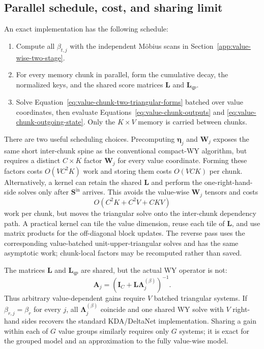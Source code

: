 \documentclass[11pt]{article}
\newcommand{\ve}[1]{\boldsymbol{#1}}
\begin{document}
\subsection{Parallel schedule, cost, and sharing limit}
\label{app:value-wise-chunk-cost}

An exact implementation has the following schedule:
\begin{enumerate}
  \item Compute all $\beta_{t,j}$ with the independent M\"obius scans in
    Section~\ref{app:value-wise-two-stage}.
  \item For every memory chunk in parallel, form the cumulative decay, the normalized keys, and
    the shared score matrices $\ve{L}$ and $\ve{L}_{qp}$.
  \item Solve Equation~\eqref{eq:value-chunk-two-triangular-forms} batched over value coordinates,
    then evaluate Equations~\eqref{eq:value-chunk-outputs} and
    \eqref{eq:value-chunk-outgoing-state}.  Only the $K\times V$ memory is carried between chunks.
\end{enumerate}

There are two useful scheduling choices.  Precomputing $\ve{\eta}_j$ and $\ve{W}_j$ exposes the same
short inter-chunk spine as the conventional compact-WY algorithm, but requires a distinct
$C\times K$ factor $\ve{W}_j$ for every value coordinate.  Forming these factors costs
$O(VC^2K)$ work and storing them costs $O(VCK)$ per chunk.  Alternatively, a kernel can retain
the shared $\ve{L}$ and perform the one-right-hand-side solves only after
$\ve{S}^{\mathrm{in}}$ arrives.  This avoids the value-wise $\ve{W}_j$ tensors and costs
\begin{equation}
  O(C^2K+C^2V+CKV)
  \label{eq:value-chunk-direct-cost}
\end{equation}
work per chunk, but moves the triangular solve onto the inter-chunk dependency path.  A practical
kernel can tile the value dimension, reuse each tile of $\ve{L}$, and use matrix products for the
off-diagonal block updates.
The reverse pass uses the corresponding value-batched unit-upper-triangular solves and has the
same asymptotic work; chunk-local factors may be recomputed rather than saved.

The matrices $\ve{L}$ and $\ve{L}_{qp}$ are shared, but the actual WY operator is not:
\begin{equation}
  \ve{A}_j=(\ve{I}_C+\ve{L}\ve{\Lambda}^{(\beta)}_j)^{-1}.
  \label{eq:value-chunk-sharing-limit}
\end{equation}
Thus arbitrary value-dependent gains require $V$ batched triangular systems.  If
$\beta_{r,j}=\beta_r$ for every $j$, all $\ve{\Lambda}^{(\beta)}_j$ coincide and one shared WY
solve with $V$ right-hand sides recovers the standard KDA/DeltaNet implementation.  Sharing a gain
within each
of $G$ value groups similarly requires only $G$ systems; it is exact for the grouped model and an
approximation to the fully value-wise model.
\end{document}
